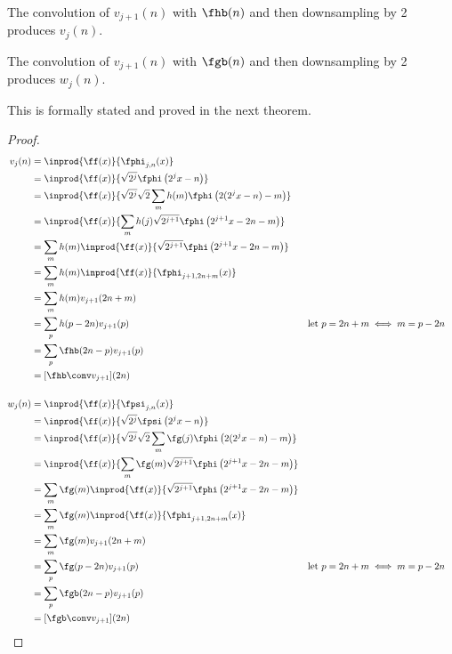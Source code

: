 \begin{liste}
   \item The convolution  of $v_{j+1}(n)$ with $\fhb(n)$ 
         and then downsampling by 2 produces $v_j(n)$.
   \item The convolution of $v_{j+1}(n)$ with $\fgb(n)$ 
         and then downsampling by 2 produces $w_j(n)$.
\end{liste}
This is formally stated and proved in the next theorem.
\begin{theorem}
\end{theorem}
\begin{proof}
\begin{align*}
    v_j(n) 
      &= \inprod{\ff(x)}{\fphi_{j,n}(x)} 
    \\&= \inprod{\ff(x)}{\sqrt{2^j}\fphi\left(2^jx-n \right)}
    \\&= \inprod{\ff(x)}{\sqrt{2^j}\sqrt{2}\sum_m h(m)\fphi\left(2(2^jx-n)-m \right)}
    \\&= \inprod{\ff(x)}{\sum_m h(j)\sqrt{2^{j+1}}\fphi\left(2^{j+1}x-2n -m \right)}
    \\&= \sum_m h(m)\inprod{\ff(x)}{\sqrt{2^{j+1}}\fphi\left(2^{j+1}x-2n -m \right)}
    \\&= \sum_m h(m)\inprod{\ff(x)}{\fphi_{j+1,2n+m}(x)}
    \\&= \sum_m h(m)v_{j+1}(2n+m)
    \\&= \sum_p h(p-2n)v_{j+1}(p)
      && \text{let }p=2n+m \iff m=p-2n
    \\&= \sum_p \fhb(2n-p) v_{j+1}(p)
    \\&= [\fhb \conv v_{j+1}](2n)
\\ 
\\
    w_j(n)
      &= \inprod{\ff(x)}{\fpsi_{j,n}(x)} 
    \\&= \inprod{\ff(x)}{\sqrt{2^j}\fpsi\left(2^jx-n \right)}
    \\&= \inprod{\ff(x)}{\sqrt{2^j}\sqrt{2}\sum_m \fg(j)\fphi\left(2(2^jx-n)-m \right)}
    \\&= \inprod{\ff(x)}{\sum_m \fg(m)\sqrt{2^{j+1}}\fphi\left(2^{j+1}x-2n -m \right)}
    \\&= \sum_m \fg(m)\inprod{\ff(x)}{\sqrt{2^{j+1}}\fphi\left(2^{j+1}x-2n -m \right)}
    \\&= \sum_m \fg(m)\inprod{\ff(x)}{\fphi_{j+1,2n+m}(x)}
    \\&= \sum_m \fg(m)v_{j+1}(2n+m)
    \\&= \sum_p \fg(p-2n)v_{j+1}(p)
      && \text{let }p=2n+m \iff m=p-2n
    \\&= \sum_p \fgb(2n-p)v_{j+1}(p) 
    \\&= [\fgb \conv v_{j+1}](2n)
   \end{align*}
\end{proof}



